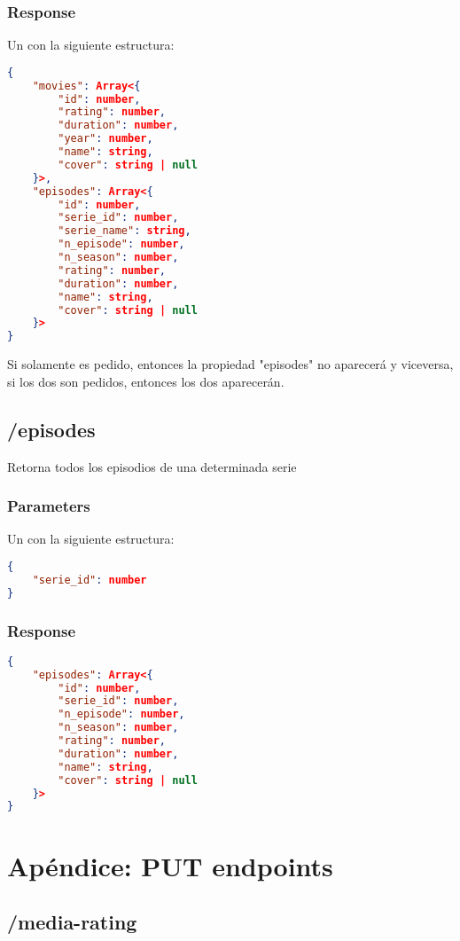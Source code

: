 \subsubsection{Response}
Un  con la siguiente estructura:

\begin{lstlisting}[language=json]
{
	"movies": Array<{
		"id": number,
		"rating": number,
		"duration": number,
		"year": number,
		"name": string,
		"cover": string | null
	}>,
	"episodes": Array<{
		"id": number,
		"serie_id": number,
		"serie_name": string,
		"n_episode": number,
		"n_season": number,
		"rating": number,
		"duration": number,
		"name": string,
		"cover": string | null
	}>
}
\end{lstlisting}

Si solamente  es pedido, entonces la propiedad "episodes" no aparecerá y viceversa, si los dos son pedidos, entonces los dos aparecerán.

\subsection{/episodes}
Retorna todos los episodios de una determinada serie

\subsubsection{Parameters}
Un  con la siguiente estructura:

\begin{lstlisting}[language=json]
{
	"serie_id": number
}
\end{lstlisting}

\subsubsection{Response}

\begin{lstlisting}[language=json]
{
	"episodes": Array<{
		"id": number,
		"serie_id": number,
		"n_episode": number,
		"n_season": number,
		"rating": number,
		"duration": number,
		"name": string,
		"cover": string | null
	}>
}
\end{lstlisting}

\section{Apéndice: PUT endpoints}

\subsection{/media-rating}

